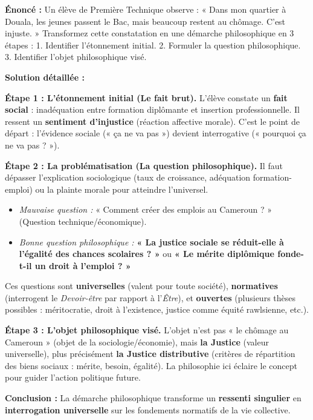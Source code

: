\documentclass[11pt]{article}
\begin{document}
\begin{exoresolu}
\textbf{Énoncé :} Un élève de Première Technique observe : « Dans mon quartier à Douala, les jeunes passent le Bac, mais beaucoup restent au chômage. C'est injuste. » Transformez cette constatation en une démarche philosophique en 3 étapes : 1. Identifier l'étonnement initial. 2. Formuler la question philosophique. 3. Identifier l'objet philosophique visé.

\tcblower
\textbf{Solution détaillée :}

\textbf{Étape 1 : L'étonnement initial (Le fait brut).}
L'élève constate un \textbf{fait social} : inadéquation entre formation diplômante et insertion professionnelle. Il ressent un \textbf{sentiment d'injustice} (réaction affective morale). C'est le point de départ : l'évidence sociale (« ça ne va pas ») devient interrogative (« pourquoi ça ne va pas ? »).

\textbf{Étape 2 : La problématisation (La question philosophique).}
Il faut dépasser l'explication sociologique (taux de croissance, adéquation formation-emploi) ou la plainte morale pour atteindre l'universel.
\begin{itemize}
    \item \emph{Mauvaise question :} « Comment créer des emplois au Cameroun ? » (Question technique/économique).
    \item \emph{Bonne question philosophique :} \textbf{« La justice sociale se réduit-elle à l'égalité des chances scolaires ? »} ou \textbf{« Le mérite diplômique fonde-t-il un droit à l'emploi ? »}
\end{itemize}
Ces questions sont \textbf{universelles} (valent pour toute société), \textbf{normatives} (interrogent le \emph{Devoir-être} par rapport à l'\emph{Être}), et \textbf{ouvertes} (plusieurs thèses possibles : méritocratie, droit à l'existence, justice comme équité rawlsienne, etc.).

\textbf{Étape 3 : L'objet philosophique visé.}
L'objet n'est pas « le chômage au Cameroun » (objet de la sociologie/économie), mais \textbf{la Justice} (valeur universelle), plus précisément \textbf{la Justice distributive} (critères de répartition des biens sociaux : mérite, besoin, égalité). La philosophie ici éclaire le concept pour guider l'action politique future.

\textbf{Conclusion :} La démarche philosophique transforme un \textbf{ressenti singulier} en \textbf{interrogation universelle} sur les fondements normatifs de la vie collective.
\end{exoresolu}
\end{document}
